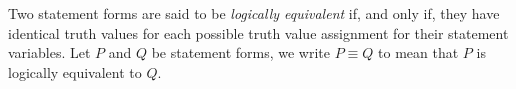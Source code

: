 \guard



\begin{defn}
\label{defn:logicallyEquivalentStatementForm}
  Two statement forms are said to be \emph{logically equivalent} if, and only if, they have identical truth values for each possible truth value assignment for their statement variables.
  Let $P$ and $Q$ be statement forms, we write $P \equiv Q$ to mean that $P$ is logically equivalent to $Q$.
\end{defn}
